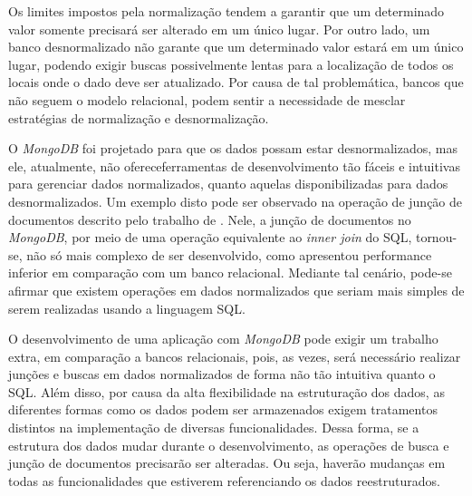 Os limites impostos pela normalização tendem a garantir que um determinado valor somente precisará ser alterado em um único lugar. Por outro lado, um banco desnormalizado não garante que um determinado valor estará em um único lugar, podendo exigir buscas possivelmente lentas para a localização de todos os locais onde o dado deve ser atualizado. Por causa de tal problemática, bancos que não seguem o modelo relacional, podem sentir a necessidade de mesclar estratégias de normalização e desnormalização.

O \textit{MongoDB} foi projetado para que os dados possam estar desnormalizados, mas ele, atualmente, não ofereceferramentas de desenvolvimento tão fáceis e intuitivas para gerenciar dados normalizados, quanto aquelas disponibilizadas para dados desnormalizados. Um exemplo disto pode ser observado na operação de junção de documentos descrito pelo trabalho de . Nele, a junção de documentos no \textit{MongoDB}, por meio de uma operação equivalente ao \textit{inner join} do SQL, tornou-se, não só mais complexo de ser desenvolvido, como apresentou performance inferior em comparação com um banco relacional. Mediante tal cenário, pode-se afirmar que existem operações em dados normalizados que seriam mais simples de serem realizadas usando a linguagem SQL.


O desenvolvimento de uma aplicação com \textit{MongoDB} pode exigir um trabalho extra, em comparação a bancos relacionais, pois, as vezes, será necessário realizar junções e buscas em dados normalizados de forma não tão intuitiva quanto o SQL. Além disso, por causa da alta flexibilidade na estruturação dos dados, as diferentes formas como os dados podem ser armazenados exigem tratamentos distintos na implementação de diversas funcionalidades. Dessa forma, se a estrutura dos dados mudar durante o desenvolvimento, as operações de busca e junção de documentos precisarão ser alteradas. Ou seja, haverão mudanças em todas as funcionalidades que estiverem referenciando os dados reestruturados.



